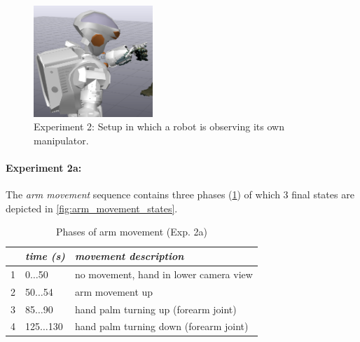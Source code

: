 \begin{figure}[h]
\captionsetup{width=0.4\textwidth}
\centering
\includegraphics[width=0.4\textwidth]{images/eval_vicon/sequence/setting.png}
\caption[Experiment 2: Setup]{Experiment 2: Setup in which a robot is observing its own manipulator.}
\label{fig:vicon_free_movement}
\end{figure}

\paragraph{Experiment 2a:}
The \textit{arm movement} sequence contains three phases (\cref{tab:vic_arm_movement_phases}) of which 3 final states are depicted in \cref{fig:arm_movement_states}.

\begin{table}[h]
\centering
\begin{tabular}{|c|l|l|}
\hline
 & \emph{time (s)} & \emph{movement description} \\
\hline
1 & 0$\dots$50 & no movement, hand in lower camera view \\
\hline
2 & 50$\dots$54 & arm movement up \\
\hline
3 & 85$\dots$90 & hand palm turning up (forearm joint) \\
\hline
4 & 125$\dots$130 & hand palm turning down (forearm joint) \\
\hline
\end{tabular}
\caption{Phases of arm movement (Exp. 2a)}
\label{tab:vic_arm_movement_phases}
\end{table}

\newlength{\imgwidth}
\setlength{\imgwidth}{0.26\textwidth}

